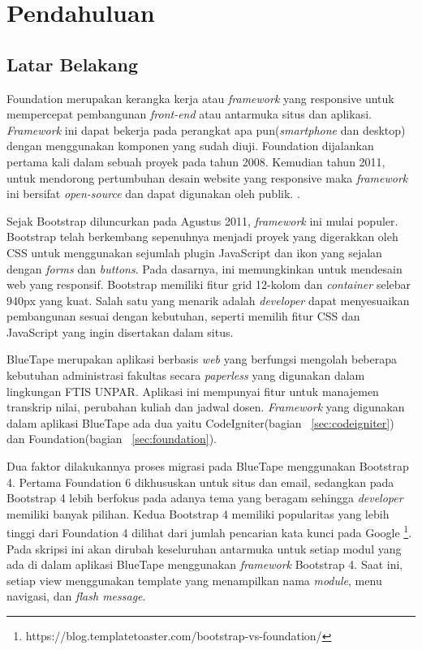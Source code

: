 \chapter{Pendahuluan}
\label{chap:intro}
   
\section{Latar Belakang}
\label{sec:label}
\par Foundation merupakan kerangka kerja atau \textit{framework} yang responsive untuk mempercepat pembangunan \textit{front-end} atau antarmuka situs dan aplikasi. \textit{Framework} ini dapat bekerja pada perangkat apa pun(\textit{smartphone} dan desktop) dengan menggunakan komponen yang sudah diuji. Foundation dijalankan pertama kali dalam sebuah proyek pada tahun 2008. Kemudian tahun 2011, untuk mendorong pertumbuhan desain website yang responsive maka \textit{framework} ini bersifat \textit{open-source} dan dapat digunakan oleh publik.
\cite{zurbfoundation:17}.
\par Sejak Bootstrap diluncurkan pada Agustus 2011, \textit{framework} ini mulai populer. Bootstrap telah berkembang sepenuhnya menjadi proyek yang digerakkan oleh CSS untuk menggunakan sejumlah plugin JavaScript dan ikon yang sejalan dengan \textit{forms} dan \textit{buttons}. Pada dasarnya, ini memungkinkan untuk mendesain web yang responsif. Bootstrap memiliki fitur grid 12-kolom dan \textit{container} selebar 940px yang kuat. Salah satu yang menarik adalah \textit{developer} dapat menyesuaikan pembangunan sesuai dengan kebutuhan, seperti memilih fitur CSS dan JavaScript yang ingin disertakan dalam situs. \cite{bootstrap:19}
\par BlueTape merupakan aplikasi berbasis \textit{web} yang berfungsi mengolah beberapa kebutuhan administrasi fakultas secara \textit{paperless} yang digunakan dalam lingkungan FTIS UNPAR.  Aplikasi ini mempunyai fitur untuk manajemen transkrip nilai, perubahan kuliah dan jadwal dosen. \textit{Framework} yang digunakan dalam aplikasi BlueTape ada dua yaitu CodeIgniter(bagian ~\ref{sec:codeigniter}) dan Foundation(bagian ~\ref{sec:foundation}).
\par Dua faktor dilakukannya proses migrasi pada BlueTape menggunakan Bootstrap 4. Pertama Foundation 6 dikhususkan untuk situs dan email, sedangkan pada Bootstrap 4 lebih berfokus pada adanya tema yang beragam sehingga \textit{developer} memiliki banyak pilihan. Kedua Bootstrap 4 memiliki popularitas yang lebih tinggi dari Foundation 4 dilihat dari jumlah pencarian kata kunci pada Google \footnote{https://blog.templatetoaster.com/bootstrap-vs-foundation/}. Pada skripsi ini akan dirubah keseluruhan  antarmuka untuk setiap modul yang ada di dalam aplikasi BlueTape menggunakan \textit{framework} Bootstrap 4. Saat ini, setiap view menggunakan template yang menampilkan nama \textit{module}, menu navigasi, dan \textit{flash message}.


